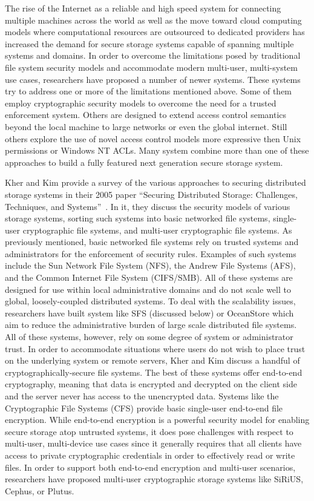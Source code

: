 \documentclass{sig-alternate}
\begin{document}
The rise of the Internet as a reliable and high speed system for
connecting multiple machines across the world as well as the move
toward cloud computing models where computational resources are
outsourced to dedicated providers has increased the demand for secure
storage systems capable of spanning multiple systems and domains. In
order to overcome the limitations posed by traditional file system
security models and accommodate modern multi-user, multi-system use
cases, researchers have proposed a number of newer systems. These
systems try to address one or more of the limitations mentioned
above. Some of them employ cryptographic security models to overcome
the need for a trusted enforcement system. Others are designed to
extend access control semantics beyond the local machine to large
networks or even the global internet. Still others explore the use of
novel access control models more expressive then Unix permissions or
Windows NT ACLs. Many system combine more than one of these approaches
to build a fully featured next generation secure storage system.

Kher and Kim provide a survey of the various approaches to securing
distributed storage systems in their 2005 paper ``Securing Distributed
Storage: Challenges, Techniques, and Systems''~\cite{Kher2005}. In it,
they discuss the security models of various storage systems, sorting
such systems into basic networked file systems, single-user
cryptographic file systems, and multi-user cryptographic file
systems. As previously mentioned, basic networked file systems rely on
trusted systems and administrators for the enforcement of security
rules. Examples of such systems include the Sun Network File System
(NFS), the Andrew File Systems (AFS), and the Common Internet File
System (CIFS/SMB). All of these systems are designed for use within
local administrative domains and do not scale well to global,
loosely-coupled distributed systems. To deal with the scalability
issues, researchers have built system like SFS (discussed below) or
OceanStore which aim to reduce the administrative burden of large
scale distributed file systems. All of these systems, however, rely on
some degree of system or administrator trust. In order to accommodate
situations where users do not wish to place trust on the underlying
system or remote servers, Kher and Kim discuss a handful of
cryptographically-secure file systems. The best of these systems offer
end-to-end cryptography, meaning that data is encrypted and decrypted
on the client side and the server never has access to the unencrypted
data.  Systems like the Cryptographic File Systems (CFS) provide basic
single-user end-to-end file encryption. While end-to-end encryption is
a powerful security model for enabling secure storage atop untrusted
systems, it does pose challenges with respect to multi-user,
multi-device use cases since it generally requires that all clients
have access to private cryptographic credentials in order to
effectively read or write files. In order to support both end-to-end
encryption and multi-user scenarios, researchers have proposed
multi-user cryptographic storage systems like SiRiUS, Cephus, or
Plutus.
\end{document}
